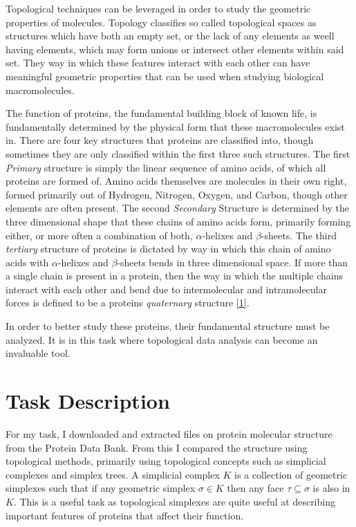 \documentclass[12pt]{article}
\begin{document}
        Topological techniques can be leveraged in order to study the geometric properties of molecules. Topology classifies so called topological 
        spaces as structures which have both an empty set, or the lack of any elements as weell having elements, which may form unions or intersect
        other elements within said set. They way in which these features interact with each other can have meaningful geometric properties that can 
        be used when studying biological macromolecules.

        The function of proteins, the fundamental building block of known life, is fundamentally determined by the physical form that these 
        macromolecules exist in. There are four key structures that proteins are classified into, though sometimes they are only classified within
        the first three such structures. The first \emph{Primary} structure is simply the linear sequence of amino acids, of which all proteins 
        are formed of. Amino acids themselves are molecules in their own right, formed primarily out of Hydrogen, Nitrogen, Oxygen, and Carbon, though
        other elements are often present. The second \emph{Secondary} Structure is determined by the three dimensional shape that these chains of amino
        acids form, primarily forming either, or more often a combination of both, $\alpha$-helixes and $\beta$-sheets. The third \emph{tertiary} 
        structure of proteins is dictated by way in which this chain of amino acids with $\alpha$-helixes and $\beta$-sheets bends in three dimensional space.
        If more than a single chain is present in a protein, then the way in which the multiple chains interact with each other and bend
        due to intermolecular and intramolecular forces is defined to be a proteins \emph{quaternary} structure \hyperref[itm:1]{[1]}.

        In order to better study these proteins, their fundamental structure must be analyzed. It is in this task where topological data analysis
        can become an invaluable tool.

    \section{Task Description}
        \label{sec:description}
        For my task, I downloaded and extracted files on protein molecular structure from the Protein Data Bank. From this
        I compared the structure using topological methods, primarily using topological concepts such as simplicial complexes and 
        simplex trees. A simplicial complex $K$ is a collection of geometric simplexes such that if any geometric simplex $\sigma \in K$
        then any face $\tau \subseteq \sigma$ is also in $K$. This is a useful task as topological simplexes are quite useful at describing
        important features of proteins that affect their function.
\end{document}

